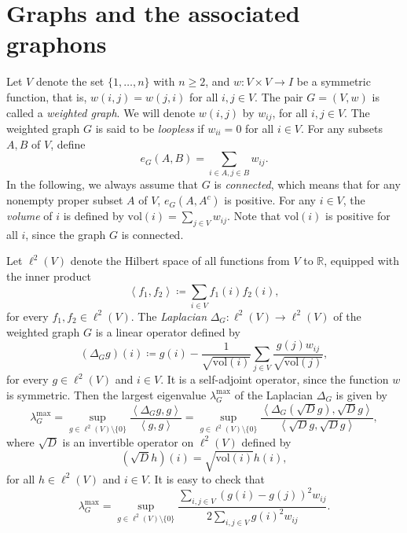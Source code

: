 \documentclass[12pt,a4paper,bold]{thesis}
\theoremstyle{definition}
\newcommand*{\map}[3]{#1 \colon #2 \to #3}
\newcommand*{\ip}[2]{\left\langle #1 , #2 \right\rangle}
\newcommand{\vol}{\ensuremath{\mathrm{vol}}}
\begin{document}
\section{Graphs and the associated graphons} \label{section:graphs&graphons}

Let $V$ denote the set $\{1, \dots, n\}$ with $n \geq 2$, and $\map{w}{V \times V}
{I}$ be a symmetric function, that is, $w(i,j) = w(j,i)$ for all $i,j \in V$.
The pair $G = (V,w)$ is called a \emph{weighted graph}. We will denote $w(i,j)$ 
by $w_{ij}$, for all $i,j \in V$. The weighted graph $G$ is said to be \emph{loopless}
if $w_{ii} = 0$ for all $i \in V$. For any subsets $A, B$ of $V$, define
\begin{equation*}
    e_G(A,B) = \sum_{i \in A, j \in B} w_{ij}.
\end{equation*}
In the following, we always assume that $G$ is \emph{connected}, which means that
for any nonempty proper subset $A$ of $V$, $e_G(A,A^c)$ is positive. 
For any $i \in V$, the \emph{volume} of $i$ is defined by $\vol(i) = \sum_{j \in V} w_{ij}$. 
Note that $\vol(i)$ is positive for all $i$, since the graph $G$ is connected.

Let $\ell^2(V)$ denote the Hilbert space 
of all functions from $V$ to $\mathbb{R}$, equipped with the inner product
\begin{equation*}
    \ip{f_1}{f_2} \coloneq \sum_{i \in V} f_1(i) f_2(i),
\end{equation*}
for every $f_1,f_2 \in \ell^2(V)$. 
The \emph{Laplacian} $\map{\Delta_G}{\ell^2(V)}{\ell^2(V)}$ of the weighted graph
$G$ is a linear operator defined by
\begin{equation*}
    (\Delta_G g)(i) \coloneq 
    g(i) - \frac{1}{\sqrt{\vol(i)}} \sum_{j \in V} \frac{g(j) w_{ij}}{\sqrt{\vol(j)}},
\end{equation*}
for every $g \in \ell^2(V)$ and $i \in V$. It is a self-adjoint operator, since 
the function $w$ is symmetric. Then the largest eigenvalue $\lambda_G^{\max}$ 
of the Laplacian $\Delta_G$ is given by
\begin{equation*}
    \lambda_G^{\max} 
    = \sup_{g \in \ell^2(V) \setminus \{0\}} \frac{\ip{\Delta_G g}{g}}{\ip{g}{g}}
    = \sup_{g \in \ell^2(V) \setminus \{0\}} 
    \frac{\ip{\Delta_G (\sqrt{D} g)}{\sqrt{D} g}}{\ip{\sqrt{D} g}{\sqrt{D} g}},
\end{equation*}
where $\sqrt{D}$ is an invertible operator on $\ell^2(V)$ defined by
\begin{equation*}
    (\sqrt{D} h)(i) = \sqrt{\vol(i)} h(i),
\end{equation*} 
for all $h \in \ell^2(V)$ and $i \in V$.
It is easy to check that
\begin{equation*}
    \lambda_G^{\max} 
    = \sup_{g \in \ell^2(V) \setminus \{0\}} 
    \frac{\sum_{i,j \in V} (g(i) - g(j))^2 w_{ij}}{2 \sum_{i,j \in V} g(i)^2 w_{ij}}.
\end{equation*}
\end{document}
